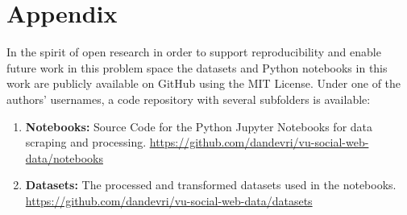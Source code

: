 \section{Appendix}

In the spirit of open research in order to support reproducibility and enable future work in this problem space the datasets and Python notebooks in this work are publicly available on GitHub using the MIT License. Under one of the authors' usernames, a code repository with several subfolders is available:

\begin{enumerate}
  \item \textbf{Notebooks:} Source Code for the Python  Jupyter Notebooks for data scraping and processing. \underline{https://github.com/dandevri/vu-social-web-data/notebooks}
  \item \textbf{Datasets:} The processed and transformed datasets used in the notebooks. \\  \underline{{https://github.com/dandevri/vu-social-web-data/datasets}}
\end{enumerate}
